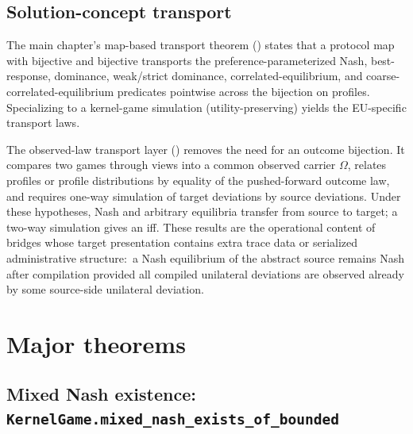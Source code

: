 \subsection{Solution-concept transport}
\label{sec:supp:transport}

The main chapter's map-based transport theorem
() states that a protocol map with
bijective  and bijective  transports the
preference-parameterized Nash, best-response, dominance,
weak/strict dominance, correlated-equilibrium, and
coarse-correlated-equilibrium predicates pointwise across the
bijection on profiles.  Specializing to a kernel-game simulation
(utility-preserving) yields the EU-specific transport laws.

The observed-law transport layer
() removes the need for an
outcome bijection.  It compares two games through views into a
common observed carrier $\Omega$, relates profiles or profile
distributions by equality of the pushed-forward outcome law, and
requires one-way simulation of target deviations by source
deviations.  Under these hypotheses, Nash and arbitrary
 equilibria transfer from source to
target; a two-way simulation gives an iff.  These results are the
operational content of bridges whose target presentation contains
extra trace data or serialized administrative structure:\ a Nash
equilibrium of the abstract source remains Nash after compilation
provided all compiled unilateral deviations are observed already by
some source-side unilateral deviation.

\section{Major theorems}
\label{sec:supp:theorems}

\subsection{Mixed Nash existence: \texttt{KernelGame.mixed\_nash\_exists\_of\_bounded}}
\label{sec:supp:nash-exists}\label{def:mixed_nash_exists}

